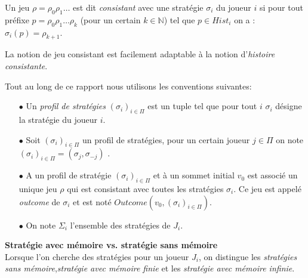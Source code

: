 \begin{defi}	
	Un jeu $\rho = \rho _{0}  \rho _{1} \ldots$ est dit \textit{consistant} avec une stratégie $\sigma _{i}$ du joueur $i$ si pour tout préfixe $p = \rho _{0}\rho _{1}\ldots \rho _{k}$ (pour un certain $k \in \mathbb{N}$) tel que $p \in Hist_{i}$ on a : $\sigma _{i}(p) = \rho_{k+1}$.	
\end{defi}

\begin{rem}
	La notion de jeu consistant est facilement adaptable à la notion d'\textit{histoire consistante}.
\end{rem}

\begin{notations}
	Tout au long de ce rapport nous utilisons les conventions suivantes:
	\begin{enumerate}
		\item[$\bullet$] Un \textit{profil de stratégies} $(\sigma _{i})_{i \in \Pi}$ est un tuple tel que pour tout $i$ $\sigma _{i}$ désigne la stratégie du 	joueur $i$. 
				
		\item[$\bullet$] Soit  $(\sigma _{i})_{i \in \Pi}$ un profil de stratégies, pour un certain joueur $j\in \Pi $ on note $(\sigma _{i})_{i \in \Pi} = ( \sigma _{j},\sigma _{-j})$ .
		
		\item[$\bullet$] A un profil de stratégie $(\sigma _{i})_{i \in \Pi}$ et à un sommet initial $v_{0}$ est associé un unique jeu $\rho$ qui est consistant avec toutes les stratégies $\sigma _{i}$. Ce jeu est appelé \textit{outcome} de $\sigma _{i}$ et est noté $Outcome(v_{0},(\sigma _{i})_{i\in \Pi})$.
		
		\item[$\bullet$] On note $\Sigma _{i}$ l'ensemble des stratégies de $J_{i}$.
		
	\end{enumerate}
\end{notations}
		



\noindent\textbf{Stratégie avec mémoire vs. stratégie sans mémoire}\\



Lorsque l'on cherche des stratégies pour un joueur $J_{i}$, on distingue les \textit{stratégies sans mémoire},\textit{stratégie avec mémoire finie} et les \textit{stratégie avec mémoire infinie}.

